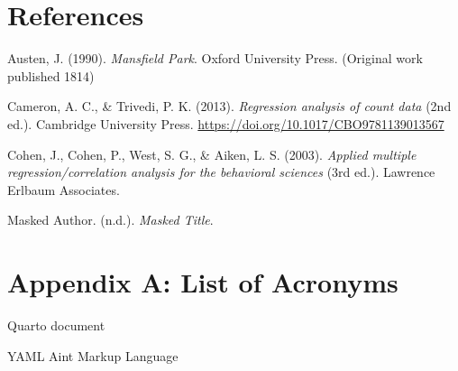 \documentclass[
  man,
  floatsintext,
  longtable,
  nolmodern,
  notxfonts,
  notimes,
  mask,
  colorlinks=true,linkcolor=blue,citecolor=blue,urlcolor=blue]{apa7}
\providecommand{\tightlist}{%
  \setlength{\itemsep}{0pt}\setlength{\parskip}{0pt}}
\newlength{\cslhangindent}
\newenvironment{CSLReferences}[2] %
 {\begin{list}{}{%
  \setlength{\itemindent}{0pt}
  \setlength{\leftmargin}{0pt}
  \setlength{\parsep}{0pt}
  \ifodd #1
   \setlength{\leftmargin}{\cslhangindent}
   \setlength{\itemindent}{-1\cslhangindent}
  \fi
  \setlength{\itemsep}{#2\baselineskip}}}
 {\end{list}}
\begin{document}
\newpage

\section{References}\label{references}

\label{refs}
\begin{CSLReferences}{1}{0}
Austen, J. (1990). \emph{Mansfield {P}ark}. Oxford University Press.
(Original work published 1814)

Cameron, A. C., \& Trivedi, P. K. (2013). \emph{Regression analysis of
count data} (2nd ed.). Cambridge University Press.
\url{https://doi.org/10.1017/CBO9781139013567}

Cohen, J., Cohen, P., West, S. G., \& Aiken, L. S. (2003). \emph{Applied
multiple regression/correlation analysis for the behavioral sciences}
(3rd ed.). Lawrence Erlbaum Associates.

Masked Author. (n.d.). \emph{Masked Title}.

\end{CSLReferences}

\newpage

\section{Appendix A: List of
Acronyms}\label{appendix-a-list-of-acronyms}

\begin{description}
\tightlist
\item[\phantomsection\label{acronyms_qmd}{qmd}]
Quarto document
\item[\phantomsection\label{acronyms_YAML}{YAML}]
YAML Aint Markup Language
\end{description}
\end{document}
